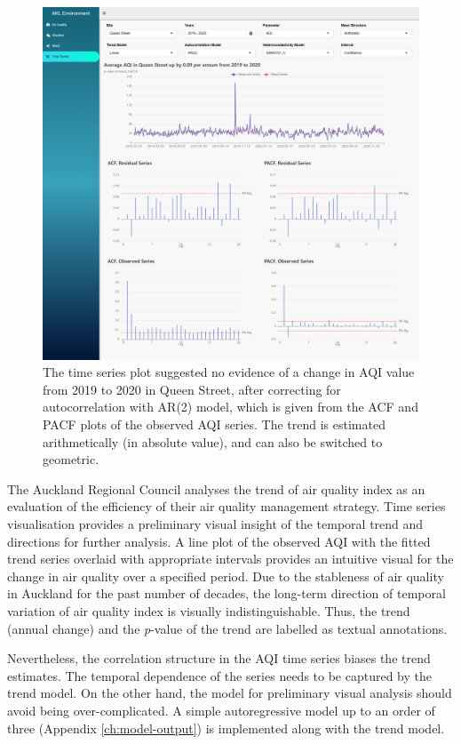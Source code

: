 \documentclass{aucklandthesis}
\begin{document}
\begin{figure}
\includegraphics[width=1\linewidth]{figures/ts-tab} \caption{The time series plot suggested no evidence of a change in AQI value from 2019 to 2020 in Queen Street, after correcting for autocorrelation with AR(2) model, which is given from the ACF and PACF plots of the observed AQI series. The trend is estimated arithmetically (in absolute value), and can also be switched to geometric.}\label{fig:unnamed-chunk-6}
\end{figure}



The Auckland Regional Council analyses the trend of air quality index as an evaluation of the efficiency of their air quality management strategy. Time series visualisation provides a preliminary visual insight of the temporal trend and directions for further analysis. A line plot of the observed AQI with the fitted trend series overlaid with appropriate intervals provides an intuitive visual for the change in air quality over a specified period. Due to the stableness of air quality in Auckland for the past number of decades, the long-term direction of temporal variation of air quality index is visually indistinguishable. Thus, the trend (annual change) and the \emph{p}-value of the trend are labelled as textual annotations.

Nevertheless, the correlation structure in the AQI time series biases the trend estimates. The temporal dependence of the series needs to be captured by the trend model. On the other hand, the model for preliminary visual analysis should avoid being over-complicated. A simple autoregressive model up to an order of three (Appendix \ref{ch:model-output}) is implemented along with the trend model.
\end{document}
